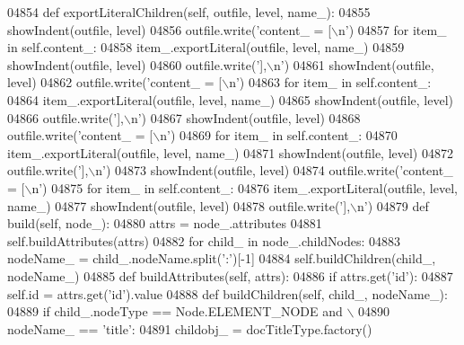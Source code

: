 \begin{DoxyCode}
{{{{{{{{{{{{{{{{{{{{{{{{{{{{{{{{{{{{{{{{{{{{{{{{{{{{{{{{{{{{{{{{{{{{{{{{{{{{{{{{{{{{{{{{{{{{{{{{{{{{{{{{{{{{{{{{{{{{{{{{{{{{{{{{{{{{{{{{{{{{{{{{{{{{{{{{{{{{{{{{{{{{{{{{{{{{{{{{{{{{{{{{{{{{{{{{{{{{{{{{{{{{{{{{{{{{{{{{{{{{{{{{{{{{{{{{{{{{{{{{{{{{{{{{{{{{{{{{{{{{{{{{{{{{{{{{{{{{{{{{{{{{{{{{{{{{{{{{{{{{{{{{{{{{{{{{{{{{{{{{{{{{{{{{04854     \textcolor{keyword}{def }exportLiteralChildren(self, outfile, level, name\_):
04855         showIndent(outfile, level)
04856         outfile.write(\textcolor{stringliteral}{'content\_ = [\(\backslash\)n'})
04857         \textcolor{keywordflow}{for} item\_ \textcolor{keywordflow}{in} self.content_:
04858             item\_.exportLiteral(outfile, level, name\_)
04859         showIndent(outfile, level)
04860         outfile.write(\textcolor{stringliteral}{'],\(\backslash\)n'})
04861         showIndent(outfile, level)
04862         outfile.write(\textcolor{stringliteral}{'content\_ = [\(\backslash\)n'})
04863         \textcolor{keywordflow}{for} item\_ \textcolor{keywordflow}{in} self.content_:
04864             item\_.exportLiteral(outfile, level, name\_)
04865         showIndent(outfile, level)
04866         outfile.write(\textcolor{stringliteral}{'],\(\backslash\)n'})
04867         showIndent(outfile, level)
04868         outfile.write(\textcolor{stringliteral}{'content\_ = [\(\backslash\)n'})
04869         \textcolor{keywordflow}{for} item\_ \textcolor{keywordflow}{in} self.content_:
04870             item\_.exportLiteral(outfile, level, name\_)
04871         showIndent(outfile, level)
04872         outfile.write(\textcolor{stringliteral}{'],\(\backslash\)n'})
04873         showIndent(outfile, level)
04874         outfile.write(\textcolor{stringliteral}{'content\_ = [\(\backslash\)n'})
04875         \textcolor{keywordflow}{for} item\_ \textcolor{keywordflow}{in} self.content_:
04876             item\_.exportLiteral(outfile, level, name\_)
04877         showIndent(outfile, level)
04878         outfile.write(\textcolor{stringliteral}{'],\(\backslash\)n'})
04879     \textcolor{keyword}{def }build(self, node\_):
04880         attrs = node\_.attributes
04881         self.buildAttributes(attrs)
04882         \textcolor{keywordflow}{for} child\_ \textcolor{keywordflow}{in} node\_.childNodes:
04883             nodeName\_ = child\_.nodeName.split(\textcolor{stringliteral}{':'})[-1]
04884             self.buildChildren(child\_, nodeName\_)
04885     \textcolor{keyword}{def }buildAttributes(self, attrs):
04886         \textcolor{keywordflow}{if} attrs.get(\textcolor{stringliteral}{'id'}):
04887             self.id = attrs.get(\textcolor{stringliteral}{'id'}).value
04888     \textcolor{keyword}{def }buildChildren(self, child\_, nodeName\_):
04889         \textcolor{keywordflow}{if} child\_.nodeType == Node.ELEMENT\_NODE \textcolor{keywordflow}{and} \(\backslash\)
04890             nodeName\_ == \textcolor{stringliteral}{'title'}:
04891             childobj\_ = docTitleType.factory()
}}}}}}}}}}}}}}}}}}}}}}}}}}}}}}}}}}}}}}}}}}}}}}}}}}}}}}}}}}}}}}}}}}}}}}}}}}}}}}}}}}}}}}}}}}}}}}}}}}}}}}}}}}}}}}}}}}}}}}}}}}}}}}}}}}}}}}}}}}}}}}}}}}}}}}}}}}}}}}}}}}}}}}}}}}}}}}}}}}}}}}}}}}}}}}}}}}}}}}}}}}}}}}}}}}}}}}}}}}}}}}}}}}}}}}}}}}}}}}}}}}}}}}}}}}}}}}}}}}}}}}}}}}}}}}}}}}}}}}}}}}}}}}}}}}}}}}}}}}}}}}}}}}}}}}}}}}}}}}}}}}}}}}}}
\end{DoxyCode}
